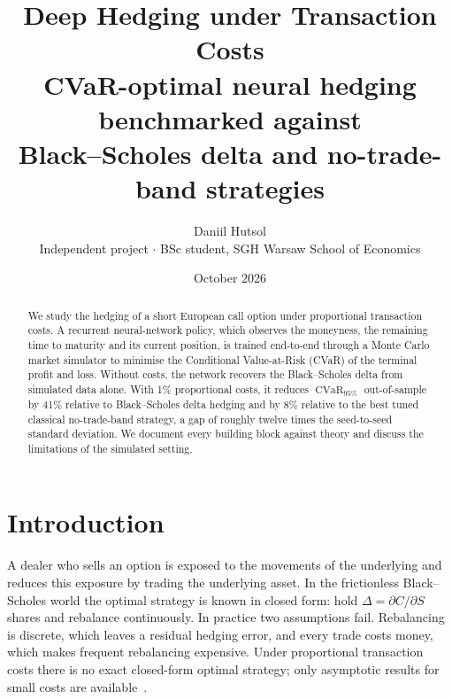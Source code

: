 \documentclass[11pt,a4paper]{article}
\title{\textbf{Deep Hedging under Transaction Costs}\\[4pt]
\large CVaR-optimal neural hedging benchmarked against\\ Black--Scholes delta and no-trade-band strategies}
\author{Daniil Hutsol\\ \small Independent project $\cdot$ BSc student, SGH Warsaw School of Economics}
\date{October 2026}
\newcommand{\CVaR}{\operatorname{CVaR}}
\begin{document}
\maketitle

\begin{abstract}
We study the hedging of a short European call option under proportional transaction costs.
A recurrent neural-network policy, which observes the moneyness, the remaining time to
maturity and its current position, is trained end-to-end through a Monte Carlo market
simulator to minimise the Conditional Value-at-Risk (CVaR) of the terminal profit and loss.
Without costs, the network recovers the Black--Scholes delta from simulated data alone.
With 1\% proportional costs, it reduces $\CVaR_{95\%}$ out-of-sample by 41\% relative to
Black--Scholes delta hedging and by 8\% relative to the best tuned classical no-trade-band
strategy, a gap of roughly twelve times the seed-to-seed standard deviation. We document every
building block against theory and discuss the limitations of the simulated setting.
\end{abstract}

\tableofcontents
\newpage

\section{Introduction}

A dealer who sells an option is exposed to the movements of the underlying and reduces this
exposure by trading the underlying asset. In the frictionless Black--Scholes world the optimal
strategy is known in closed form: hold $\Delta = \partial C/\partial S$ shares and rebalance
continuously. In practice two assumptions fail. Rebalancing is discrete, which leaves a residual
hedging error, and every trade costs money, which makes frequent rebalancing expensive. Under
proportional transaction costs there is no exact closed-form optimal strategy; only asymptotic
results for small costs are available~\cite{whalley1997,leland1985}.
\end{document}
